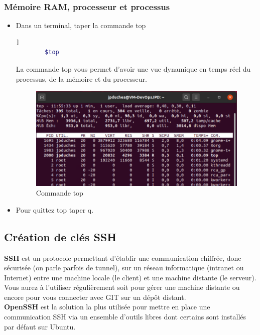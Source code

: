 	\subsubsection{Mémoire RAM, processeur et processus }
	
	\begin{itemize}
		\item  Dans un terminal, taper la commande {\color{blue}top}
		
		\begin{lstlisting}[language=bash]   ]
		$top
		\end{lstlisting}
		La commande top vous permet d'avoir une vue dynamique en temps réel du processus, de la mémoire et du processeur.
		
		\begin{figure}[!htb]
			\centering
			\includegraphics[scale=0.65]{images/captureTOP}
			\caption{Commande top}
			\label{top}
		\end{figure}
		\item Pour quittez top taper {\color{blue}q}.
	\end{itemize}
	
	\subsection{Création de clés SSH}
	
	
	\textbf{SSH} est un protocole permettant d'établir une communication chiffrée, donc sécurisée (on parle parfois de tunnel), sur un réseau informatique (intranet ou Internet) entre une machine locale (le client) et une machine distante (le serveur). Vous aurez à l'utiliser régulièrement soit pour gérer une machine distante ou encore pour vous connecter avec GIT sur un dépôt distant.\\
	
	\textbf{OpenSSH} est la solution la plus utilisée pour mettre en place une communication SSH via un ensemble d'outils libres dont certains sont installés par défaut sur Ubuntu.
	
